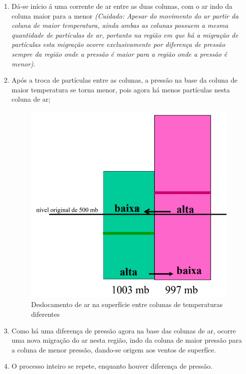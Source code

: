 \begin{enumerate}[label=\roman *)]
\begin{enumerate}[label=\alph *)]
\begin{figure}[htb!]
						\end{figure}
			\end{enumerate}
		\item Dá-se início á uma corrente de ar entre as duas colunas, com o ar indo da coluna maior para a menor \textit{(Cuidado: Apesar do movimento do ar partir da coluna de maior temperatura, ainda ambas as colunas possuem a mesma quantidade de partículas de ar, portanto na região em que há a migração de partículas esta migração ocorre exclusivamente por diferença de pressão sempre da região onde a pressão é maior para a região onde a pressão é menor)}.
		\item Após a troca de partículas entre as colunas, a pressão na base da coluna de maior temperatura se torna menor, pois agora há menos partículas nesta coluna de ar;
			\begin{figure}[htb!]
				\centering
				\includegraphics[width=.45\linewidth]{assets/deslocamento-ar-02.png}
				\caption{Deslocamento de ar na superfície entre colunas de temperaturas diferentes}
				\label{fig:gradiente02}
			\end{figure}
		\item Como há uma diferença de pressão agora na base das colunas de ar, ocorre uma nova migração do ar nesta região, indo da coluna de maior pressão para a coluna de menor pressão, dando-se origem aos ventos de superfíce.
		\item O processo inteiro se repete, enquanto houver diferença de pressão.
\end{enumerate}
